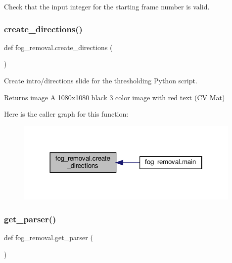 Check that the input integer for the starting frame number is valid. 

\mbox{\label{namespacefog__removal_acc10907c635ab765dcf02a6fc6499620}} 
\subsubsection{\texorpdfstring{create\+\_\+directions()}{create\_directions()}}
{\footnotesize\ttfamily def fog\+\_\+removal.\+create\+\_\+directions (\begin{DoxyParamCaption}{ }\end{DoxyParamCaption})}



Create intro/directions slide for the thresholding Python script. 

\begin{DoxyReturn}{Returns}
image A 1080x1080 black 3 color image with red text (CV Mat) 
\end{DoxyReturn}
Here is the caller graph for this function\+:
\nopagebreak
\begin{figure}[H]
\begin{center}
\leavevmode
\includegraphics[width=310pt]{namespacefog__removal_acc10907c635ab765dcf02a6fc6499620_icgraph}
\end{center}
\end{figure}
\mbox{\label{namespacefog__removal_a89c98f8f9a6d048485938fc05675ce9e}} 
\subsubsection{\texorpdfstring{get\+\_\+parser()}{get\_parser()}}
{\footnotesize\ttfamily def fog\+\_\+removal.\+get\+\_\+parser (\begin{DoxyParamCaption}{ }\end{DoxyParamCaption})}



